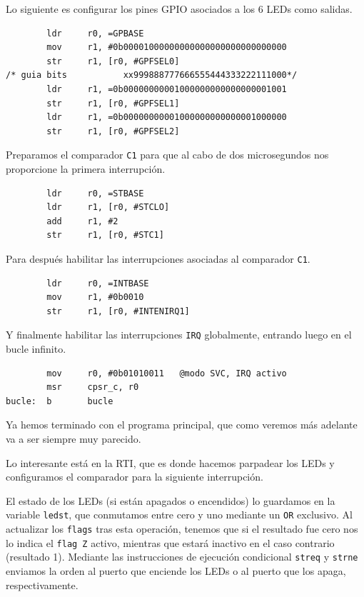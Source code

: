 Lo siguiente es configurar los pines GPIO asociados a los 6 LEDs como salidas.

\begin{lstlisting}
        ldr     r0, =GPBASE
        mov     r1, #0b00001000000000000000000000000000
        str     r1, [r0, #GPFSEL0]
/* guia bits           xx999888777666555444333222111000*/
        ldr     r1, =0b00000000001000000000000000001001
        str     r1, [r0, #GPFSEL1]
        ldr     r1, =0b00000000001000000000000001000000
        str     r1, [r0, #GPFSEL2]
\end{lstlisting}

Preparamos el comparador {\tt C1} para que al cabo de dos microsegundos nos proporcione la primera
interrupción.

\begin{lstlisting}
        ldr     r0, =STBASE
        ldr     r1, [r0, #STCLO]
        add     r1, #2
        str     r1, [r0, #STC1]
\end{lstlisting}

Para después habilitar las interrupciones asociadas al comparador {\tt C1}.

\begin{lstlisting}
        ldr     r0, =INTBASE
        mov     r1, #0b0010
        str     r1, [r0, #INTENIRQ1]
\end{lstlisting}

Y finalmente habilitar las interrupciones {\tt IRQ} globalmente, entrando luego en
el bucle infinito.

\begin{lstlisting}
        mov     r0, #0b01010011   @modo SVC, IRQ activo
        msr     cpsr_c, r0
bucle:  b       bucle
\end{lstlisting}

Ya hemos terminado con el programa principal, que como veremos más adelante va a ser
siempre muy parecido.

Lo interesante está en la RTI, que es donde hacemos parpadear los LEDs y configuramos
el comparador para la siguiente interrupción.

El estado de los LEDs (si están apagados o encendidos) lo guardamos en la variable
{\tt ledst}, que conmutamos entre cero y uno mediante un {\tt OR} exclusivo. Al
actualizar los {\tt flags} tras esta operación, tenemos que si el resultado fue
cero nos lo indica el {\tt flag Z} activo, mientras que estará inactivo en el
caso contrario (resultado 1). Mediante las instrucciones de ejecución condicional
{\tt streq} y {\tt strne} enviamos la orden al puerto que enciende los LEDs o al
puerto que los apaga, respectivamente.


